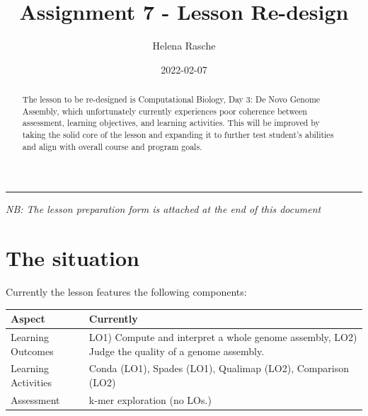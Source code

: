 \documentclass[paper=a4,justified,a4paper]{tufte-handout}
\title[A7 - Lesson Re-design]{Assignment 7 - Lesson Re-design}
\author{Helena Rasche}
\date{2022-02-07}
\begin{document}
\maketitle
\begin{abstract}
The lesson to be re-designed is Computational Biology, Day 3: De Novo
Genome Assembly, which unfortunately currently experiences poor
coherence between assessment, learning objectives, and learning
activities. This will be improved by taking the solid core of the lesson
and expanding it to further test student's abilities and align with
overall course and program goals.
\end{abstract}
\noindent\rule{5in}{0.4pt}


\emph{NB: The lesson preparation form is attached at the end of this
document}

\hypertarget{the-situation}{%
\section{The situation}\label{the-situation}}

Currently the lesson features the following components:

\begin{longtable}[]{@{}ll@{}}
\toprule
\begin{minipage}[b]{0.31\columnwidth}\raggedright
Aspect\strut
\end{minipage} & \begin{minipage}[b]{0.63\columnwidth}\raggedright
Currently\strut
\end{minipage}\tabularnewline
\midrule
\endhead
\begin{minipage}[t]{0.31\columnwidth}\raggedright
Learning Outcomes\strut
\end{minipage} & \begin{minipage}[t]{0.63\columnwidth}\raggedright
LO1) Compute and interpret a whole genome assembly, LO2) Judge the
quality of a genome assembly.\strut
\end{minipage}\tabularnewline
\begin{minipage}[t]{0.31\columnwidth}\raggedright
Learning Activities\strut
\end{minipage} & \begin{minipage}[t]{0.63\columnwidth}\raggedright
Conda (LO1), Spades (LO1), Qualimap (LO2), Comparison (LO2)\strut
\end{minipage}\tabularnewline
\begin{minipage}[t]{0.31\columnwidth}\raggedright
Assessment\strut
\end{minipage} & \begin{minipage}[t]{0.63\columnwidth}\raggedright
k-mer exploration (no LOs.)\strut
\end{minipage}\tabularnewline
\bottomrule
\end{longtable}
\end{document}
